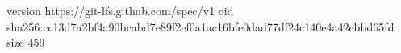version https://git-lfs.github.com/spec/v1
oid sha256:cc13d7a2bf4a90bcabd7e89f2ef0a1ac16bfe0dad77df24c140e4a42ebbd65fd
size 459

